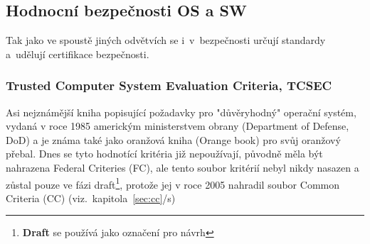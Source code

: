 \documentclass[a4paper,12pt]{article}
\newcommand{\odkazNaKapitolu}[1]{(viz.~kapitola~\ref{#1}/s\pageref{#1})}
\renewcommand{\b}[1]{\textbf{#1}} %
\begin{document}

\subsection{Hodnocní bezpečnosti OS a SW}
Tak jako ve spoustě jiných odvětvích se i~v~bezpečnosti určují standardy a~udělují certifikace bezpečnosti.
\subsubsection{Trusted Computer System Evaluation Criteria, TCSEC} \label{sec:TCSEC}
Asi nejznámější kniha popisující požadavky pro "důvěryhodný" operační systém, vydaná v roce 1985 americkým ministerstvem obrany (Department of Defense, DoD) a je známa také jako oranžová kniha (Orange book) pro svůj oranžový přebal. Dnes se tyto hodnotící kritéria již nepoužívají, původně měla být nahrazena Federal Criteries (FC), ale tento soubor kritérií nebyl nikdy nasazen a zůstal pouze ve fázi draft\footnote{\b{Draft} se používá jako označení pro návrh}, protože jej v roce 2005 nahradil soubor Common Criteria (CC) \odkazNaKapitolu{sec:cc}\\
\end{document}
